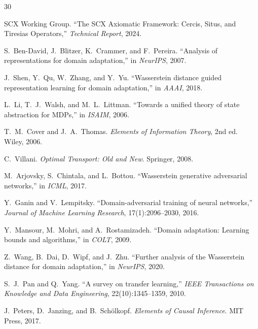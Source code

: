 \documentclass[12pt,a4paper]{article}
\begin{document}

\begin{thebibliography}{30}

SCX Working Group.
\newblock ``The SCX Axiomatic Framework: Cercis, Situs, and Tiresias
Operators,''
\newblock \emph{Technical Report}, 2024.

S.~Ben-David, J.~Blitzer, K.~Crammer, and F.~Pereira.
\newblock ``Analysis of representations for domain adaptation,''
\newblock in \emph{NeurIPS}, 2007.

J.~Shen, Y.~Qu, W.~Zhang, and Y.~Yu.
\newblock ``Wasserstein distance guided representation learning for domain
adaptation,''
\newblock in \emph{AAAI}, 2018.

L.~Li, T.~J.~Walsh, and M.~L.~Littman.
\newblock ``Towards a unified theory of state abstraction for MDPs,''
\newblock in \emph{ISAIM}, 2006.

T.~M.~Cover and J.~A.~Thomas.
\newblock \emph{Elements of Information Theory}, 2nd ed.
\newblock Wiley, 2006.

C.~Villani.
\newblock \emph{Optimal Transport: Old and New}.
\newblock Springer, 2008.

M.~Arjovsky, S.~Chintala, and L.~Bottou.
\newblock ``Wasserstein generative adversarial networks,''
\newblock in \emph{ICML}, 2017.

Y.~Ganin and V.~Lempitsky.
\newblock ``Domain-adversarial training of neural networks,''
\newblock \emph{Journal of Machine Learning Research}, 17(1):2096--2030,
2016.

Y.~Mansour, M.~Mohri, and A.~Rostamizadeh.
\newblock ``Domain adaptation: Learning bounds and algorithms,''
\newblock in \emph{COLT}, 2009.

Z.~Wang, B.~Dai, D.~Wipf, and J.~Zhu.
\newblock ``Further analysis of the Wasserstein distance for domain
adaptation,''
\newblock in \emph{NeurIPS}, 2020.

S.~J.~Pan and Q.~Yang.
\newblock ``A survey on transfer learning,''
\newblock \emph{IEEE Transactions on Knowledge and Data Engineering},
22(10):1345--1359, 2010.

J.~Peters, D.~Janzing, and B.~Sch\"olkopf.
\newblock \emph{Elements of Causal Inference}.
\newblock MIT Press, 2017.

\end{thebibliography}
\end{document}
